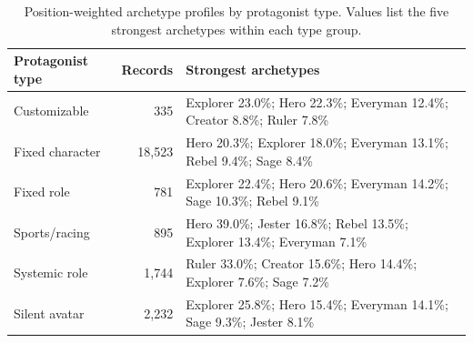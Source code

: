 \begin{table}[t]
\centering
\caption{Position-weighted archetype profiles by protagonist type. Values list the five strongest archetypes within each type group.}
\label{tab:archetype_profiles_by_type}
\small
\setlength{\tabcolsep}{4pt}
\renewcommand{\arraystretch}{1.08}
\begin{tabularx}{\textwidth}{p{3.0cm}rX}
\toprule
\textbf{Protagonist type} & \textbf{Records} & \textbf{Strongest archetypes} \\
\midrule
Customizable & 335 & Explorer 23.0\%; Hero 22.3\%; Everyman 12.4\%; Creator 8.8\%; Ruler 7.8\% \\
Fixed character & 18,523 & Hero 20.3\%; Explorer 18.0\%; Everyman 13.1\%; Rebel 9.4\%; Sage 8.4\% \\
Fixed role & 781 & Explorer 22.4\%; Hero 20.6\%; Everyman 14.2\%; Sage 10.3\%; Rebel 9.1\% \\
Sports/racing & 895 & Hero 39.0\%; Jester 16.8\%; Rebel 13.5\%; Explorer 13.4\%; Everyman 7.1\% \\
Systemic role & 1,744 & Ruler 33.0\%; Creator 15.6\%; Hero 14.4\%; Explorer 7.6\%; Sage 7.2\% \\
Silent avatar & 2,232 & Explorer 25.8\%; Hero 15.4\%; Everyman 14.1\%; Sage 9.3\%; Jester 8.1\% \\
\bottomrule
\end{tabularx}
\end{table}
